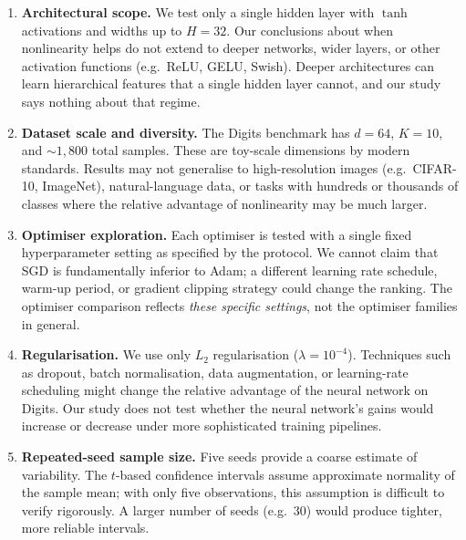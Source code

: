 \documentclass[11pt]{article}
\begin{document}
\begin{enumerate}[leftmargin=2em,itemsep=0.3em]
  \item \textbf{Architectural scope.}
        We test only a single hidden layer with $\tanh$ activations and widths up to
        $H{=}32$.  Our conclusions about when nonlinearity helps do not extend to deeper
        networks, wider layers, or other activation functions (e.g.\ ReLU, GELU, Swish).
        Deeper architectures can learn hierarchical features that a single hidden layer
        cannot, and our study says nothing about that regime.

  \item \textbf{Dataset scale and diversity.}
        The Digits benchmark has $d{=}64$, $K{=}10$, and ${\sim}1{,}800$ total samples.
        These are toy-scale dimensions by modern standards.  Results may not generalise to
        high-resolution images (e.g.\ CIFAR-10, ImageNet), natural-language data, or tasks
        with hundreds or thousands of classes where the relative advantage of nonlinearity
        may be much larger.

  \item \textbf{Optimiser exploration.}
        Each optimiser is tested with a single fixed hyperparameter setting as specified by
        the protocol.  We cannot claim that SGD is fundamentally inferior to Adam; a
        different learning rate schedule, warm-up period, or gradient clipping strategy
        could change the ranking.  The optimiser comparison reflects \emph{these specific
        settings}, not the optimiser families in general.

  \item \textbf{Regularisation.}
        We use only $L_2$ regularisation ($\lambda{=}10^{-4}$).  Techniques such as
        dropout, batch normalisation, data augmentation, or learning-rate scheduling might
        change the relative advantage of the neural network on Digits.  Our study does not
        test whether the neural network's gains would increase or decrease under more
        sophisticated training pipelines.

  \item \textbf{Repeated-seed sample size.}
        Five seeds provide a coarse estimate of variability.  The $t$-based confidence
        intervals assume approximate normality of the sample mean; with only five
        observations, this assumption is difficult to verify rigorously.  A larger number
        of seeds (e.g.\ 30) would produce tighter, more reliable intervals.


\end{enumerate}
\end{document}
